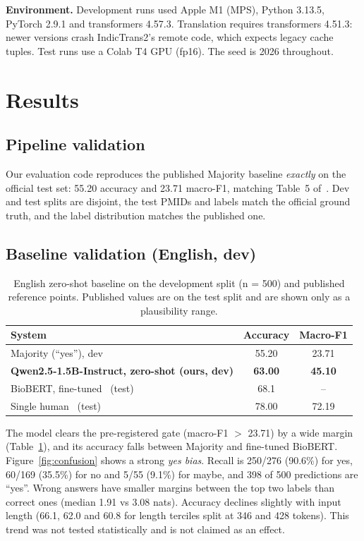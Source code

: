 \documentclass[acmsmall,nonacm]{acmart}
\begin{document}
\textbf{Environment.} Development runs used Apple M1 (MPS), Python 3.13.5, PyTorch 2.9.1 and transformers 4.57.3. Translation requires transformers 4.51.3: newer versions crash IndicTrans2's remote code, which expects legacy cache tuples. Test runs use a Colab T4 GPU (fp16). The seed is 2026 throughout.

\section{Results}

\subsection{Pipeline validation}
Our evaluation code reproduces the published Majority baseline \emph{exactly} on the official test set: 55.20 accuracy and 23.71 macro-F1, matching Table~5 of~\cite{jin2019pubmedqa}. Dev and test splits are disjoint, the test PMIDs and labels match the official ground truth, and the label distribution matches the published one.

\subsection{Baseline validation (English, dev)}

\begin{table}[t]
\caption{English zero-shot baseline on the development split (n = 500) and published reference points. Published values are on the test split and are shown only as a plausibility range.}
\label{tab:baseline}
\small
\begin{tabular}{lcc}
\toprule
System & Accuracy & Macro-F1 \\
\midrule
Majority (``yes''), dev & 55.20 & 23.71 \\
\textbf{Qwen2.5-1.5B-Instruct, zero-shot (ours, dev)} & \textbf{63.00} & \textbf{45.10} \\
\midrule
BioBERT, fine-tuned~\cite{jin2019pubmedqa} (test) & 68.1 & -- \\
Single human~\cite{jin2019pubmedqa} (test) & 78.00 & 72.19 \\
\bottomrule
\end{tabular}
\end{table}

The model clears the pre-registered gate (macro-F1 $>$ 23.71) by a wide margin (Table~\ref{tab:baseline}), and its accuracy falls between Majority and fine-tuned BioBERT. Figure~\ref{fig:confusion} shows a strong \emph{yes bias}. Recall is 250/276 (90.6\%) for yes, 60/169 (35.5\%) for no and 5/55 (9.1\%) for maybe, and 398 of 500 predictions are ``yes''. Wrong answers have smaller margins between the top two labels than correct ones (median 1.91 vs 3.08 nats). Accuracy declines slightly with input length (66.1, 62.0 and 60.8 for length terciles split at 346 and 428 tokens). This trend was not tested statistically and is not claimed as an effect.
\end{document}
